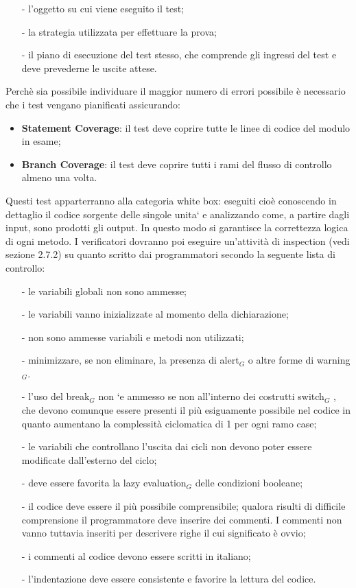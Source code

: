\begin{itemize}
	\item[-] l'oggetto su cui viene eseguito il test;
	\item[-] la strategia utilizzata per effettuare la prova;
	\item[-] il piano di esecuzione del test stesso, che comprende gli ingressi del test e deve prevederne le uscite attese.
\end{itemize}
Perchè sia possibile individuare il maggior numero di errori possibile è necessario che i test vengano pianificati assicurando:

\begin{itemize}
	\item \textbf{Statement Coverage}: il test deve coprire tutte le linee di codice del modulo in esame;
	\item \textbf{Branch Coverage}: il test deve coprire tutti i rami del flusso di controllo almeno una volta.
\end{itemize}
Questi test apparterranno alla categoria white box: eseguiti cioè conoscendo in dettaglio il codice sorgente delle singole unita` e analizzando come, a partire dagli input, sono prodotti gli output.
In questo modo si garantisce la correttezza logica di ogni metodo.
I verificatori dovranno poi eseguire un'attività di inspection (vedi sezione 2.7.2) su quanto scritto dai programmatori secondo la seguente lista di controllo:

\begin{itemize}
	\item[-] le variabili globali non sono ammesse;
	\item[-] le variabili vanno inizializzate al momento della dichiarazione;
	\item[-] non sono ammesse variabili e metodi non utilizzati;
	\item[-] minimizzare, se non eliminare, la presenza di alert$_G$ o altre forme di warning$_G$.
	\item[-] l'uso del break$_G$ non `e ammesso se non all'interno dei costrutti switch$_G$ , che devono comunque essere presenti il più esiguamente possibile nel codice in quanto aumentano la complessità ciclomatica di 1 per ogni ramo case;
	\item[-] le variabili che controllano l'uscita dai cicli non devono poter essere modificate dall'esterno del ciclo;
	\item[-] deve essere favorita la lazy evaluation$_G$ delle condizioni booleane;
	\item[-] il codice deve essere il più possibile comprensibile; qualora risulti di difficile comprensione il programmatore deve inserire dei commenti. I commenti non vanno tuttavia inseriti per descrivere righe il cui significato è ovvio;
	\item[-] i commenti al codice devono essere scritti in italiano;
	\item[-] l'indentazione deve essere consistente e favorire la lettura del codice.
\end{itemize}

